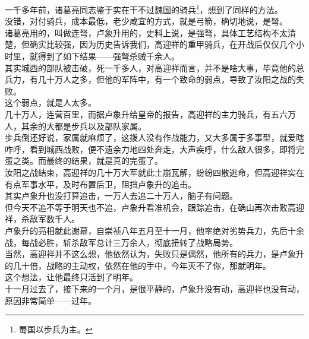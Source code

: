 \begin{multicols}{\theparacolNo}
一千多年前，诸葛亮同志鉴于实在干不过魏国的骑兵\footnote{蜀国以步兵为主。}，想到了同样的方法。\\

没错，对付骑兵，成本最低，老少咸宜的方式，就是弓箭，确切地说，是弩。\\

诸葛亮用的，叫做连弩，卢象升用的，史料上说，是强弩，具体工艺结构不太清楚，但确实比较强，因为历史告诉我们，高迎祥的重甲骑兵，在开战后仅仅几个小时里，就得到了如下结果——强弩杀贼千余人。\\

其实城西的部队被击破，死一千多人，对高迎祥而言，并不是啥大事，毕竟他的总兵力，有几十万人之多，但他的军阵中，有一个致命的弱点，导致了汝阳之战的失败。\\

这个弱点，就是人太多。\\

几十万人，连营百里，而据卢象升给皇帝的报告，高迎祥的主力骑兵，有五六万人，其余的大都是步兵以及部队家属。\\

步兵倒还好说，家属就麻烦了，这拨人没有作战能力，又大多属于多事型，就爱瞎咋呼，看到城西战败，便不遗余力地四处奔走，大声疾呼，什么敌人很多，即将完蛋之类。而最终的结果，就是真的完蛋了。\\

汝阳之战结束，高迎祥的几十万大军就此土崩瓦解，纷纷四散逃命，但高迎祥实在有点军事水平，及时布置后卫，阻挡卢象升的追击。\\

其实卢象升也没打算追击，一万人去追二十万人，脑子有问题。\\

但今天不追不等于明天也不追，卢象升看准机会，跟踪追击，在确山再次击败高迎祥，杀敌军数千人。\\

卢象升的亮相就此谢幕，自崇祯八年五月至十一月，他率绝对劣势兵力，先后十余战，每战必胜，斩杀敌军总计三万余人，彻底扭转了战略局势。\\

当然，高迎祥并不这么想，他依然认为，失败只是偶然，他所有的兵力，是卢象升的几十倍，战略的主动权，依然在他的手中，今年灭不了你，那就明年。\\

这个想法，让他最终只活到了明年。\\

十一月过去了，接下来的一个月，是很平静的，卢象升没有动，高迎祥也没有动，原因非常简单——过年。\\


\end{multicols}

